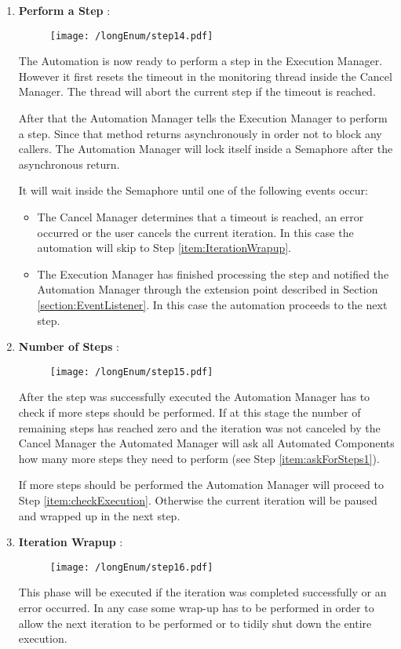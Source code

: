 \begin{enumerate}
 \item \label{item:performStep} \textbf{Perform a Step} :
\begin{figure}[H]
  \centering
  \texttt{[image: /longEnum/step14.pdf]}
\end{figure}
The Automation is now ready to perform a step in the Execution Manager.
However it first resets the timeout in the monitoring thread inside the Cancel Manager. The thread will
abort the current step if the timeout is reached.

After that the Automation Manager tells the Execution Manager to perform a step. Since that method
returns asynchronously in order not to block any callers. The Automation Manager will lock itself
inside a Semaphore after the asynchronous return.

It will wait inside the Semaphore until one of the following events occur:
  \begin{itemize}
   \item The Cancel Manager determines that a timeout is reached, an error occurred or the user cancels
the current iteration. In this case the automation will skip to Step \ref{item:IterationWrapup}.
   \item The Execution Manager has finished processing the step and notified the Automation Manager
through the extension point described in Section \ref{section:EventListener}. In this case
the automation proceeds to the next step.
  \end{itemize}

 \item \label{item:askForSteps2} \textbf{Number of Steps} :
\begin{figure}[H]
  \centering
  \texttt{[image: /longEnum/step15.pdf]}
\end{figure}
After the step was successfully executed the Automation Manager has
to check if more steps should be performed. If at this stage the number of remaining steps has
reached zero and the iteration was not canceled by the Cancel Manager the Automated Manager will
ask all Automated Components how many more steps they need to perform (see Step \ref{item:askForSteps1}).

If more steps should be performed the Automation Manager will proceed to Step \ref{item:checkExecution}. Otherwise
the current iteration will be paused and wrapped up in the next step.

 \item \label{item:IterationWrapup} \textbf{Iteration Wrapup} :
\begin{figure}[H]
  \centering
  \texttt{[image: /longEnum/step16.pdf]}
\end{figure}
This phase will be executed if the iteration was completed successfully
or an error occurred. In any case some wrap-up has to be performed in order to allow the next iteration to
be performed or to tidily shut down the entire execution.


\end{enumerate}
